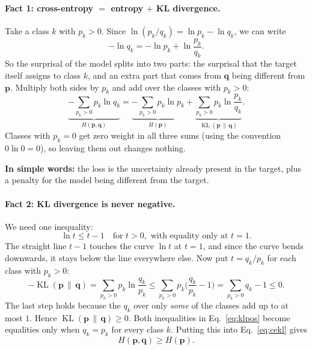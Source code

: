 \documentclass[12pt]{article}
\numberwithin{equation}{section} %
\newcommand{\vc}[1]{\symbf{#1}}
\begin{document}
\paragraph{Fact 1: cross-entropy $=$ entropy $+$ KL divergence.}
Take a class $k$ with $p_k > 0$. Since
$\ln (p_k/q_k) = \ln p_k - \ln q_k$, we can write
\begin{equation}
  -\ln q_k = -\ln p_k + \ln\frac{p_k}{q_k}.
  \label{eq:split}
\end{equation}
So the surprisal of the model splits into two parts: the surprisal
that the target itself assigns to class $k$, and an extra part that
comes from $\vc{q}$ being different from $\vc{p}$. Multiply both sides
by $p_k$ and add over the classes with $p_k > 0$:
\begin{equation}
  \underbrace{-\sum_{p_k>0} p_k \ln q_k}_{H(\vc{p},\vc{q})}
  = \underbrace{-\sum_{p_k>0} p_k \ln p_k}_{H(\vc{p})}
  + \underbrace{\sum_{p_k>0} p_k \ln\frac{p_k}{q_k}}_{\operatorname{KL}(\vc{p}\,\|\,\vc{q})}.
  \label{eq:cekl}
\end{equation}
Classes with $p_k = 0$ get zero weight in all three sums (using the
convention $0 \ln 0 = 0$), so leaving them out changes nothing.

\textbf{In simple words:} the loss is the uncertainty already present
in the target, plus a penalty for the model being different from the
target.

\paragraph{Fact 2: KL divergence is never negative.}
We need one inequality:
\begin{equation}
  \ln t \le t - 1 \quad \text{for } t > 0,
  \text{ with equality only at } t = 1.
  \label{eq:lnineq}
\end{equation}
The straight line $t - 1$ touches the curve $\ln t$ at $t = 1$, and
since the curve bends downwards, it stays below the line everywhere
else. Now put $t = q_k/p_k$ for each class with $p_k > 0$:
\begin{equation}
  -\operatorname{KL}(\vc{p}\,\|\,\vc{q})
  = \sum_{p_k>0} p_k \ln\frac{q_k}{p_k}
  \le \sum_{p_k>0} p_k \Big(\frac{q_k}{p_k} - 1\Big)
  = \sum_{p_k>0} q_k - 1
  \le 0.
  \label{eq:klpos}
\end{equation}
The last step holds because the $q_k$ over only \emph{some} of the
classes add up to at most $1$. Hence
$\operatorname{KL}(\vc{p}\,\|\,\vc{q}) \ge 0$. Both inequalities in
Eq.~\eqref{eq:klpos} become equalities only when $q_k = p_k$ for every
class $k$. Putting this into Eq.~\eqref{eq:cekl} gives
\begin{equation}
  H(\vc{p},\vc{q}) \ge H(\vc{p}).
  \label{eq:floor}
\end{equation}
\end{document}
